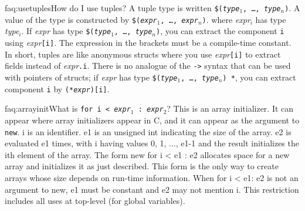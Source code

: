 \begin{faqa}{faq:usetuples}{How do I use tuples?}
A tuple type is written
\texttt{\$(\textit{type}$_1$, \ldots, \textit{type}$_n$)}.
A value of the type is constructed by
\texttt{\$(\textit{expr}$_1$, \ldots, \textit{expr}$_n$)}.
where \textit{expr}$_i$ has type \textit{type}$_i$.  
If \textit{expr} has type
\texttt{\$(\textit{type}$_1$, \ldots, \textit{type}$_n$)},
you can extract the component \texttt{i} using
\textit{expr}\texttt{[i]}.
The expression in the brackets must be a compile-time constant.  In
short, tuples are like anonymous structs where you use
\textit{expr}\texttt{[i]} to extract fields instead of
\textit{expr}\texttt{.i}.
There is no analogue of the \texttt{->} syntax that can be used with
pointers of structs; if 
\textit{expr} has type
\texttt{\$(\textit{type}$_1$, \ldots, \textit{type}$_n$) *},
you can extract component \texttt{i} by \texttt{(*\textit{expr})[i]}.
\end{faqa}

\begin{faqa}{faq:arrayinit}{What is \texttt{\lb for i < {\it expr}$_1$ : {\it expr}$_2$\rb}?}
This is an array initializer.  It can appear where array
initializers appear in C, and it can appear as the argument to
\texttt{new}.
i
is an identifier.  e1 is an unsigned int indicating the size of the
array.  e2 is evaluated e1 times, with i having values 0, 1, ..., e1-1
and the result initializes the ith element of the array.  The form new
{for i < e1 : e2} allocates space for a new array and initializes it
as just described.  This form is the only way to create arrays whose
size depends on run-time information.  When {for i < e1: e2} is not an
argument to new, e1 must be constant and e2 may not mention i.  This
restriction includes all uses at top-level (for global variables).
\end{faqa}

